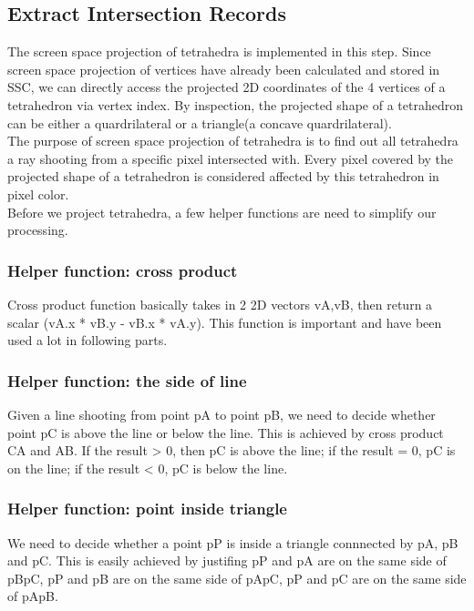 \documentclass[acmtog]{acmart}
\begin{document}
\subsection{Extract Intersection Records}
The screen space projection of tetrahedra is implemented in this step. Since screen space projection of vertices have already been calculated and stored in SSC, we can directly access the projected 2D coordinates of the 4 vertices of a tetrahedron via vertex index. By inspection, the projected shape of a tetrahedron can be either a quardrilateral or a triangle(a concave quardrilateral).
\\The purpose of screen space projection of tetrahedra is to find out all tetrahedra a ray shooting from a specific pixel intersected with. Every pixel covered by the projected shape of a tetrahedron is considered affected by this tetrahedron in pixel color.
\\Before we project tetrahedra, a few helper functions are need to simplify our processing.
\\
\subsubsection{Helper function: cross product}
Cross product function basically takes in 2 2D vectors vA,vB, then return a scalar (vA.x * vB.y - vB.x * vA.y). This function is important and have been used a lot in following parts. 
\\
\subsubsection{Helper function: the side of line}
Given a line shooting from point pA to point pB, we need to decide whether point pC is above the line or below the line. This is achieved by cross product CA and AB. If the result > 0, then pC is above the line; if the result = 0, pC is on the line; if the result < 0, pC is below the line.
\\
\subsubsection{Helper function: point inside triangle}
We need to decide whether a point pP is inside a triangle connnected by pA, pB and pC. This is easily achieved by justifing pP and pA are on the same side of pBpC, pP and pB are on the same side of pApC, pP and pC are on the same side of pApB.
\\
\end{document}
